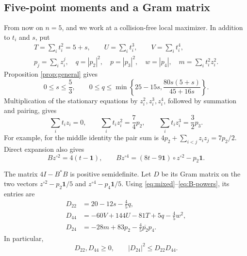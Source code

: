 \documentclass[11pt]{article}
\theoremstyle{remark}
\newcommand{\one}{\mathbf 1}
\numberwithin{equation}{section}
\begin{document}
\subsection{Five-point moments and a Gram matrix}
From now on $n=5$, and we work at a collision-free local maximizer.
In addition to $t_i$ and $s$, put
\begin{equation}\label{eq:notation}
\begin{gathered}
 T=\sum_i t_i^2=5+s,\qquad U=\sum_i t_i^3,\qquad V=\sum_i t_i^4,\\
 p_j=\sum_i z_i^j,\quad q=|p_2|^2,\quad p=|p_3|^2,\quad
 w=|p_4|,\quad m=\sum_i t_i^2z_i^2.
\end{gathered}
\end{equation}
Proposition \ref{prop:general} gives
\begin{equation}\label{eq:domain}
 0\le s\le\frac53,\qquad
 0\le q\le \min\left\{25-15s,\frac{80s(5+s)}{45+16s}\right\}.
\end{equation}
Multiplication of the stationary equations by $z_i^2,z_i^3,z_i^4$,
followed by summation and pairing, gives
\begin{equation}\label{eq:mixed}
 \sum_i t_i z_i=0,\qquad
 \sum_i t_i z_i^2=\frac74p_2,\qquad
 \sum_i t_i z_i^3=\frac32p_3.
\end{equation}
For example, for the middle identity the pair sum is
$4p_2+\sum_{i<j}z_i z_j=7p_2/2$.
Direct expansion also gives
\begin{equation}\label{eq:B-powers}
 Bz^{\circ2}=4(t-\one),\qquad
 Bz^{\circ4}=(8t-9\one)\circ z^{\circ2}-p_2\one.
\end{equation}

The matrix $4I-B^*B$ is positive semidefinite.
Let $D$ be its Gram matrix on the two vectors
$z^{\circ2}-p_2\one/5$ and $z^{\circ4}-p_4\one/5$.
Using \eqref{eq:mixed}--\eqref{eq:B-powers}, its entries are
\begin{equation}\label{eq:D}
\begin{aligned}
 D_{22}&=20-12s-\frac45q,\\
 D_{44}&=-60V+144U-81T+5q-\frac45w^2,\\
 D_{24}&=-28m+83p_2-\frac45\overline{p_2}p_4.
\end{aligned}
\end{equation}
In particular,
\begin{equation}\label{eq:D-psd}
 D_{22},D_{44}\ge0,\qquad |D_{24}|^2\le D_{22}D_{44}.
\end{equation}
\end{document}
